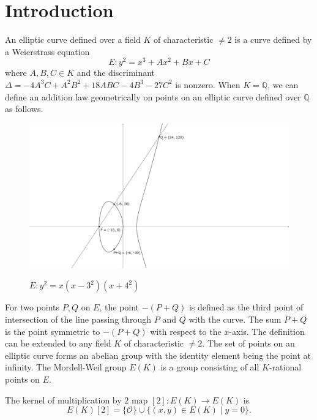 \documentclass[main]{subfiles}
\begin{document}
\section{Introduction}

An elliptic curve defined over a field $K$ of characteristic $\neq 2$ is a curve defined by a Weierstrass equation
\begin{equation*}
    E: y^{2} = x^{3} + Ax^2 + Bx + C
\end{equation*}
where $A,B,C \in K$ and the discriminant $\Delta = -4A^3C + A^2B^2 + 18ABC - 4B^3 - 27C^2$ is nonzero.
When $K=\mathbb{Q}$, we can define an addition law geometrically on points on an elliptic curve defined over $\mathbb{Q}$ as follows.
\begin{figure}[H]
    \centering
    \caption{$E: y^2 = x(x-3^2)(x+4^2)$}
    \includegraphics[keepaspectratio, width=\linewidth]{figures/3-4-5.png}
    \label{fig:elliptic_curve}
\end{figure}
For two points $P,Q$ on $E$, the point $-(P+Q)$ is defined as the third point of intersection of the line passing through $P$ and $Q$ with the curve.
The sum $P+Q$ is the point symmetric to $-(P+Q)$ with respect to the $x$-axis.
The definition can be extended to any field $K$ of characteristic $\neq 2$.
The set of points on an elliptic curve forms an abelian group with the identity element being the point at infinity.
The Mordell-Weil group $E(K)$ is a group consisting of all $K$-rational points on $E$.

\begin{prop}
    The kernel of multiplication by $2$ map $[2]: E(K) \to E(K)$ is
    \begin{equation*}
        E(K)[2] = \{ \mathcal{O} \} \cup \{ (x,y) \in E(K) \mid y = 0 \}.
    \end{equation*}
\end{prop}
\end{document}

